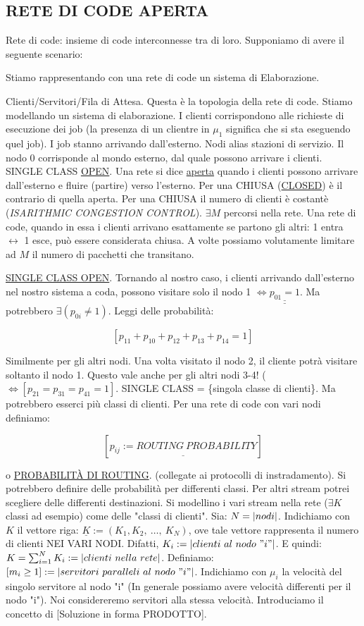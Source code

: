 \subsection{RETE DI CODE APERTA}

Rete di code: insieme di code interconnesse tra di loro. Supponiamo di avere il seguente scenario:



Stiamo rappresentando con una rete di code un sistema di Elaborazione.

Clienti/Servitori/Fila di Attesa. Questa è la topologia della rete di code. Stiamo modellando un sistema di elaborazione. I clienti corrispondono alle richieste di esecuzione dei job (la presenza di un clientre in $\mu_1$ significa che si sta eseguendo quel job). I job stanno arrivando dall'esterno. Nodi alias stazioni di servizio. Il nodo 0 corrisponde al mondo esterno, dal quale possono arrivare i clienti. SINGLE CLASS \underline{OPEN}. Una rete si dice \underline{aperta} quando i clienti possono arrivare dall'esterno e fluire (partire) verso l'esterno. Per una CHIUSA (\underline{CLOSED}) è il contrario di quella aperta. Per una CHIUSA il numero di clienti è costantè (\textit{ISARITHMIC CONGESTION CONTROL}). $\exists M$ percorsi nella rete. Una rete di code, quando in essa i clienti arrivano esattamente se partono gli altri: 1 entra $\leftrightarrow$ 1 esce, può essere considerata chiusa. A volte possiamo volutamente limitare ad $M$ il numero di pacchetti che transitano. 

\underline{SINGLE CLASS OPEN}. Tornando al nostro caso, i clienti arrivando dall'esterno nel nostro sistema a coda, possono visitare solo il nodo 1 $\iff \underline{\underline{p_{01}=1}}$. Ma potrebbero $\exists(p_{0i}\neq 1)$. Leggi delle probabilità:

\[
	[p_{11}+p_{10}+p_{12}+p_{13}+p_{14} = 1]
\]

Similmente per gli altri nodi. Una volta visitato il nodo 2, il cliente potrà visitare soltanto il nodo 1. Questo vale anche per gli altri nodi 3-4! ($\iff [p_{21}=p_{31}=p_{41}=1]$. SINGLE CLASS = \{singola classe di clienti\}. Ma potrebbero esserci più classi di clienti. Per una rete di code con vari nodi definiamo:

\[
	[\underline{p_{ij} := ROUTING\ PROBABILITY}]
\]

o \underline{PROBABILIT\`A DI ROUTING}. (collegate ai protocolli di instradamento). Si potrebbero definire delle probabilità per differenti classi. Per altri stream potrei scegliere delle differenti destinazioni. Si modellino i vari stream nella rete ($\exists K$ classi ad esempio) come delle "classi di clienti". Sia: $N=\left\vert{nodi}\right\vert$. Indichiamo con $K$ il vettore riga: $\underline{K} := (K_1,K_2,\ \dots,\ K_N)$, ove tale vettore rappresenta il numero di clienti NEI VARI NODI. Difatti, $K_i:=\cardinality{clienti\ al\ nodo\ "i"}$. E quindi: $K=\sum_{i=1}^N{K_i} := \left\vert{clienti\ nella\ rete}\right\vert$. Definiamo: $[m_i\geq 1]:=\cardinality{servitori\ paralleli\ al\ nodo\ "i"}$. Indichiamo con $\mu_i$ la velocità del singolo servitore al nodo "i" (In generale possiamo avere velocità differenti per il nodo "i"). Noi considereremo servitori alla stessa velocità. Introduciamo il concetto di [Soluzione in forma PRODOTTO].

